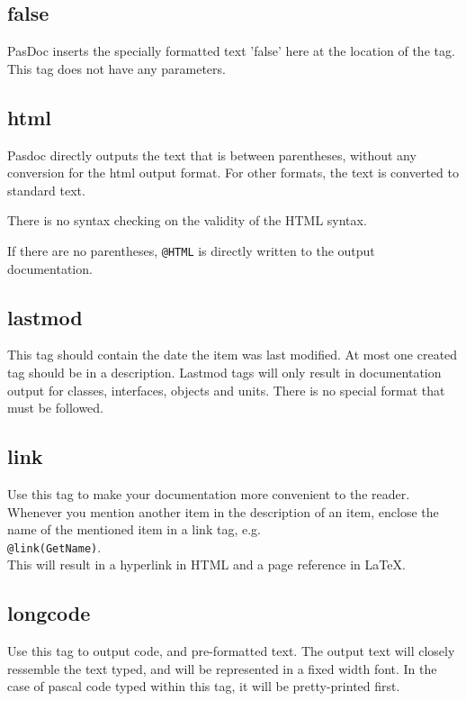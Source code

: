 \documentclass[11pt]{article}
\begin{document}
\subsection{false}
PasDoc inserts the specially formatted text 'false' here
at the location of the tag. This tag does not have any
parameters.

\subsection{html}
Pasdoc directly outputs the text that is between parentheses,
without any conversion for the html output format. For other 
formats, the text is converted to standard text. 

There is no syntax checking on the validity of the HTML syntax.

If there are no parentheses, {\tt @HTML} is directly written
to the output documentation.

\subsection{lastmod}

This tag should contain the date the item was last modified.
At most one created tag should be in a description.
Lastmod tags will only result in documentation output for
classes, interfaces, objects and units.
There is no special format that must be followed.

\subsection{link}

Use this tag to make your documentation more convenient to the reader.
Whenever you mention another item in the description of an item,
enclose the name of the mentioned item in a link tag, e.g.\\
{\tt @link(GetName)}.\\
This will result in a hyperlink in HTML and a page reference in
\LaTeX.

\subsection{longcode}

Use this tag to output code, and pre-formatted text. The output
text will closely ressemble the text typed, and will be represented
in a fixed width font. In the case of pascal code typed within this
tag, it will be pretty-printed first.
\end{document}
